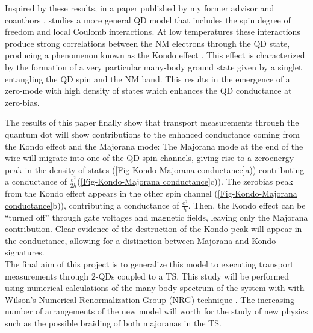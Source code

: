 Inspired by these results, in a paper published by my former advisor
and coauthors \citep{ruiz-tijerina_interaction_2015}, \citeauthor{ruiz-tijerina_interaction_2015}
studies a more general QD model that includes the spin degree of freedom
and local Coulomb interactions. At low temperatures these interactions produce strong correlations
between the NM electrons through the QD state, producing a phenomenon
known as the Kondo effect \citep{hewson_kondo_1997}. This effect
is characterized by the formation of a very particular many-body ground state given by
a singlet entangling the QD spin and the NM band. This results in the emergence of a zero-mode with high density of states which enhances the QD conductance at zero-bias.


The results of this paper finally show that transport measurements
through the quantum dot will show contributions to the enhanced conductance
coming from the Kondo effect and the Majorana mode: The Majorana mode
at the end of the wire will migrate into one of the QD spin channels,
giving rise to a zero\textendash energy peak in the density of states
(\ref{Fig-Kondo-Majorana conductance}a)) contributing a conductance
of $\frac{e^{2}}{2h}$(\ref{Fig-Kondo-Majorana conductance}c)). The
zero\textendash bias peak from the Kondo effect appears in the other
spin channel (\ref{Fig-Kondo-Majorana conductance}b)), contributing
a conductance of $\frac{e^{2}}{h}$. Then, the Kondo effect can be
\textquotedblleft turned off\textquotedblright{} through gate voltages
and magnetic fields, leaving only the Majorana contribution. Clear
evidence of the destruction of the Kondo peak will appear in the conductance,
allowing for a distinction between Majorana and Kondo signatures.\\

The final aim of this project is to generalize this model to executing
transport measurements through $2$-QDs coupled to a TS. This study
will be performed using numerical calculations of the many-body spectrum
of the system with with Wilson\textquoteright s Numerical Renormalization
Group (NRG) technique \citep{wilson_renormalization_1975}. The increasing
number of arrangements of the new model will worth for the study of
new physics such as the possible braiding\citep{kitaev_fault-tolerant_2003}
of both majoranas in the TS. 



